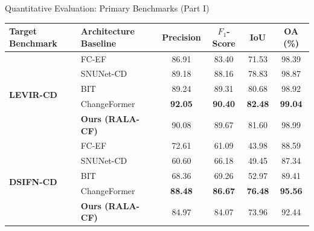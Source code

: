 \documentclass[aspectratio=169]{beamer}
\begin{document}
\begin{frame}{Quantitative Evaluation: Primary Benchmarks (Part I)}

\centering

\renewcommand{\arraystretch}{1.15}
\small
\begin{tabular}{|l|l|c|c|c|c|}
\hline
\textbf{Target Benchmark} & \textbf{Architecture Baseline} & \textbf{Precision} & \textbf{$F_1$-Score} & \textbf{IoU} & \textbf{OA (\%)} \\
\hline
\hline
\multirow{5}{*}{\textbf{LEVIR-CD}} & FC-EF & 86.91 & 83.40 & 71.53 & 98.39 \\ \cline{2-6}
                          & SNUNet-CD & 89.18 & 88.16 & 78.83 & 98.87 \\ \cline{2-6}
                          & BIT & 89.24 & 89.31 & 80.68 & 98.92 \\ \cline{2-6}
                          & ChangeFormer & \textbf{92.05} & \textbf{90.40} & \textbf{82.48} & \textbf{99.04} \\ \cline{2-6}
                          & \textbf{Ours (RALA-CF)} & \cellcolor{pastelorange} 90.08 & \cellcolor{pastelorange} 89.67 & \cellcolor{pastelorange} 81.60 & \cellcolor{pastelorange} 98.99 \\
\hline
\hline
\multirow{5}{*}{\textbf{DSIFN-CD}} & FC-EF & 72.61 & 61.09 & 43.98 & 88.59 \\ \cline{2-6}
                          & SNUNet-CD & 60.60 & 66.18 & 49.45 & 87.34 \\ \cline{2-6}
                          & BIT & 68.36 & 69.26 & 52.97 & 89.41 \\ \cline{2-6}
                          & ChangeFormer & \textbf{88.48} & \textbf{86.67} & \textbf{76.48} & \textbf{95.56} \\ \cline{2-6}
                          & \textbf{Ours (RALA-CF)} & \cellcolor{pastelorange} 84.97 & \cellcolor{pastelorange} 84.07 & \cellcolor{pastelorange} 73.96 & \cellcolor{pastelorange} 92.44 \\
\hline
\end{tabular}

\end{frame}
\end{document}
